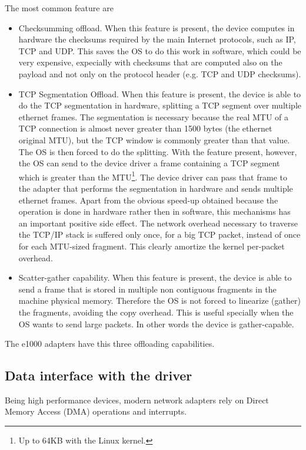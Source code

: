 The most common feature are
\begin{itemize}
    \item Checksumming offload. When this feature is present, the device computes in hardware the checksums required by the main Internet 
	  protocols, such as IP, TCP and UDP. This saves the OS to do this work in software, which could be very expensive, expecially 
	  with checksums that are computed also on the payload and not only on the protocol header (e.g. TCP and UDP checksums).
	  
    \item TCP Segmentation Offload. When this feature is present, the device is able to do the TCP segmentation in hardware, splitting
	  a TCP segment over multiple ethernet frames. The segmentation is necessary because the real MTU of a TCP connection is almost
	  never greater than 1500 bytes (the ethernet original MTU), but the TCP window is commonly greater than that value. The OS
	  is then forced to do the splitting. With the feature present, however, the OS can send to the device driver a frame containing a 
	  TCP segment which is greater than the MTU\footnote{Up to 64KB with the Linux kernel.}. The device driver can pass that frame to
	  the adapter that performs the segmentation in hardware and sends multiple ethernet frames.
	  Apart from the obvious speed-up obtained because the operation is done in hardware rather then in software, this mechanisms has 
	  an important positive side effect. The network overhead necessary to traverse the TCP/IP stack is suffered only once, for a
	  big TCP packet, instead of once for each MTU-sized fragment. This clearly amortize the kernel per-packet overhead.
	  
    \item Scatter-gather capability. When this feature is present, the device is able to send a frame that is stored in multiple non
	  contiguous fragments in the machine physical memory. Therefore the OS is not forced to linearize (gather) the fragments,
	  avoiding the copy overhead. This is useful specially when the OS wants to send large packets. In other words the device is 
	  gather-capable.
\end{itemize}
The e1000 adapters have this three offloading capabilities.


\subsection{Data interface with the driver}
\label{sec:e1000-interface}
Being high performance devices, modern network adapters rely on Direct Memory Access (DMA) operations and interrupts.

